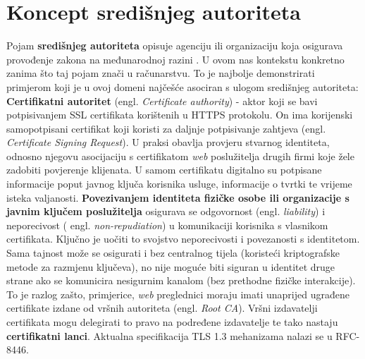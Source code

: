 \documentclass[utf8, zavrsni]{fer}
\begin{document}
\section{Koncept središnjeg autoriteta}
Pojam \textbf{središnjeg autoriteta} opisuje agenciju ili organizaciju koja osigurava provođenje zakona na međunarodnoj razini \cite{enwiki:969028445}. U ovom nas kontekstu konkretno zanima što taj pojam znači u računarstvu. To je najbolje demonstrirati primjerom koji je u ovoj domeni najčešće asociran s ulogom središnjeg autoriteta: \textbf{Certifikatni autoritet} (engl. \textit{Certificate authority}) - aktor koji se bavi potpisivanjem SSL certifikata korištenih u HTTPS protokolu. On ima korijenski samopotpisani certifikat koji koristi za daljnje potpisivanje zahtjeva (engl. \textit{Certificate Signing Request}). U praksi obavlja provjeru stvarnog identiteta, odnosno njegovu asocijaciju s certifikatom \textit{web} poslužitelja drugih firmi koje žele zadobiti povjerenje klijenata. U samom certifikatu digitalno su potpisane informacije poput javnog ključa korisnika usluge, informacije o tvrtki te vrijeme isteka valjanosti. \textbf{Povezivanjem identiteta fizičke osobe ili organizacije s javnim ključem poslužitelja} osigurava se odgovornost (engl. \textit{liability}) i neporecivost ( engl. \textit{non-repudiation}) u komunikaciji korisnika s vlasnikom certifikata. Ključno je uočiti to svojstvo neporecivosti i povezanosti s identitetom. Sama tajnost može se osigurati i bez centralnog tijela (koristeći kriptografske metode za razmjenu ključeva), no nije moguće biti siguran u identitet druge strane ako se komunicira nesigurnim kanalom (bez prethodne fizičke interakcije). To je razlog zašto, primjerice, \textit{web} preglednici moraju imati unaprijed ugrađene certifikate izdane od vršnih autoriteta (engl. \textit{Root CA}). Vršni izdavatelji certifikata mogu delegirati to pravo na podređene izdavatelje te tako nastaju \textbf{certifikatni lanci}. Aktualna specifikacija TLS 1.3 mehanizama nalazi se u RFC-8446.
\end{document}
